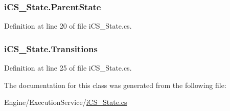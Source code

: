 \hypertarget{classi_c_s___state_a1e84880a51a962cc0bf11aa9edc6b720}{
\subsubsection[{Parent\+State}]{ i\+C\+S\+\_\+\+State.\+Parent\+State\hspace{0.3cm}{\ttfamily [get]}}}\label{classi_c_s___state_a1e84880a51a962cc0bf11aa9edc6b720}


Definition at line 20 of file i\+C\+S\+\_\+\+State.\+cs.

\hypertarget{classi_c_s___state_acab635f65159bc3b57776e6198382c9e}{
\subsubsection[{Transitions}]{ i\+C\+S\+\_\+\+State.\+Transitions\hspace{0.3cm}{\ttfamily [get]}}}\label{classi_c_s___state_acab635f65159bc3b57776e6198382c9e}


Definition at line 25 of file i\+C\+S\+\_\+\+State.\+cs.



The documentation for this class was generated from the following file\+:\begin{DoxyCompactItemize}
\item 
Engine/\+Execution\+Service/\hyperlink{i_c_s___state_8cs}{i\+C\+S\+\_\+\+State.\+cs}\end{DoxyCompactItemize}
